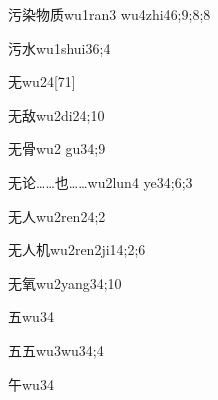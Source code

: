\begin{verbete}{污染物质}{wu1ran3 wu4zhi4}{6;9;8;8}
\end{verbete}

\begin{verbete}{污水}{wu1shui3}{6;4}
\end{verbete}

\begin{verbete}{无}{wu2}{4}[71]
\end{verbete}

\begin{verbete}{无敌}{wu2di2}{4;10}
\end{verbete}

\begin{verbete}{无骨}{wu2 gu3}{4;9}
\end{verbete}

\begin{verbete}{无论……也……}{wu2lun4 ye3}{4;6;3}
\end{verbete}

\begin{verbete}{无人}{wu2ren2}{4;2}
\end{verbete}

\begin{verbete}{无人机}{wu2ren2ji1}{4;2;6}
\end{verbete}

\begin{verbete}{无氧}{wu2yang3}{4;10}
\end{verbete}

\begin{verbete}{五}{wu3}{4}
\end{verbete}

\begin{verbete}{五五}{wu3wu3}{4;4}
\end{verbete}

\begin{verbete}{午}{wu3}{4}
\end{verbete}


